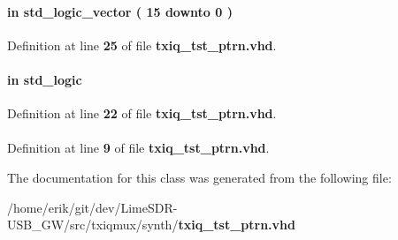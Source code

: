 \paragraph[{ptrn\+\_\+q}]{ {\bfseries \textcolor{keywordflow}{in}\textcolor{vhdlchar}{ }} {\bfseries \textcolor{comment}{std\+\_\+logic\+\_\+vector}\textcolor{vhdlchar}{ }\textcolor{vhdlchar}{(}\textcolor{vhdlchar}{ }\textcolor{vhdlchar}{ } \textcolor{vhdldigit}{15} \textcolor{vhdlchar}{ }\textcolor{keywordflow}{downto}\textcolor{vhdlchar}{ }\textcolor{vhdlchar}{ } \textcolor{vhdldigit}{0} \textcolor{vhdlchar}{ }\textcolor{vhdlchar}{)}\textcolor{vhdlchar}{ }} \hspace{0.3cm}{\ttfamily [Port]}}\label{classtxiq__tst__ptrn_a5f04c959c2b6871d1bee46e0c2746f62}


Definition at line {\bf 25} of file {\bf txiq\+\_\+tst\+\_\+ptrn.\+vhd}.

\paragraph[{reset\+\_\+n}]{ {\bfseries \textcolor{keywordflow}{in}\textcolor{vhdlchar}{ }} {\bfseries \textcolor{comment}{std\+\_\+logic}\textcolor{vhdlchar}{ }} \hspace{0.3cm}{\ttfamily [Port]}}\label{classtxiq__tst__ptrn_a446ea52ed8c4a84181a47d9165ce41a5}


Definition at line {\bf 22} of file {\bf txiq\+\_\+tst\+\_\+ptrn.\+vhd}.

\paragraph[{std\+\_\+logic\+\_\+1164}]{\hspace{0.3cm}{\ttfamily [Package]}}\label{classtxiq__tst__ptrn_acd03516902501cd1c7296a98e22c6fcb}


Definition at line {\bf 9} of file {\bf txiq\+\_\+tst\+\_\+ptrn.\+vhd}.



The documentation for this class was generated from the following file\+:\begin{DoxyCompactItemize}
\item 
/home/erik/git/dev/\+Lime\+S\+D\+R-\/\+U\+S\+B\+\_\+\+G\+W/src/txiqmux/synth/{\bf txiq\+\_\+tst\+\_\+ptrn.\+vhd}\end{DoxyCompactItemize}
